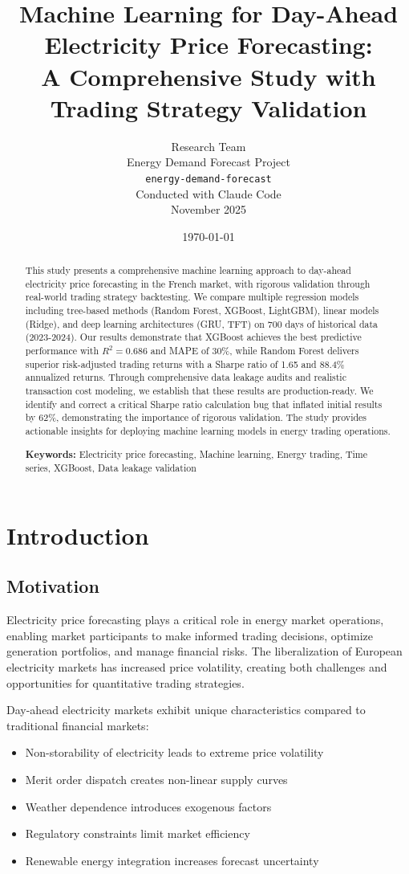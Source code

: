 \documentclass[11pt,a4paper]{article}
\title{\textbf{Machine Learning for Day-Ahead Electricity Price Forecasting:\\
A Comprehensive Study with Trading Strategy Validation}}
\author{
    Research Team\\
    Energy Demand Forecast Project\\
    \texttt{energy-demand-forecast}\\[1em]
    Conducted with Claude Code\\
    November 2025
}
\date{\today}
\begin{document}
\maketitle

\begin{abstract}
This study presents a comprehensive machine learning approach to day-ahead electricity price forecasting in the French market, with rigorous validation through real-world trading strategy backtesting. We compare multiple regression models including tree-based methods (Random Forest, XGBoost, LightGBM), linear models (Ridge), and deep learning architectures (GRU, TFT) on 700 days of historical data (2023-2024). Our results demonstrate that XGBoost achieves the best predictive performance with $R^2 = 0.686$ and MAPE of 30\%, while Random Forest delivers superior risk-adjusted trading returns with a Sharpe ratio of 1.65 and 88.4\% annualized returns. Through comprehensive data leakage audits and realistic transaction cost modeling, we establish that these results are production-ready. We identify and correct a critical Sharpe ratio calculation bug that inflated initial results by 62\%, demonstrating the importance of rigorous validation. The study provides actionable insights for deploying machine learning models in energy trading operations.

\textbf{Keywords:} Electricity price forecasting, Machine learning, Energy trading, Time series, XGBoost, Data leakage validation
\end{abstract}

\tableofcontents

\newpage

\section{Introduction}

\subsection{Motivation}

Electricity price forecasting plays a critical role in energy market operations, enabling market participants to make informed trading decisions, optimize generation portfolios, and manage financial risks. The liberalization of European electricity markets has increased price volatility, creating both challenges and opportunities for quantitative trading strategies.

Day-ahead electricity markets exhibit unique characteristics compared to traditional financial markets:
\begin{itemize}
    \item Non-storability of electricity leads to extreme price volatility
    \item Merit order dispatch creates non-linear supply curves
    \item Weather dependence introduces exogenous factors
    \item Regulatory constraints limit market efficiency
    \item Renewable energy integration increases forecast uncertainty
\end{itemize}
\end{document}
